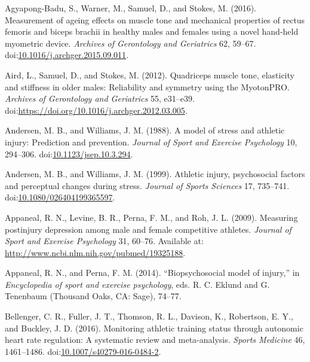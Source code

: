 \documentclass[
  english,
  man,floatsintext]{apa6}
\newlength{\cslhangindent}
\newenvironment{cslreferences}%
  {\setlength{\parindent}{0pt}%
  \everypar{\setlength{\hangindent}{\cslhangindent}}\ignorespaces}%
  {\par}
\begin{document}
\hypertarget{refs}{}
\begin{cslreferences}
\leavevmode\hypertarget{ref-Agyapong-Badu2016}{}%
Agyapong-Badu, S., Warner, M., Samuel, D., and Stokes, M. (2016). Measurement of ageing effects on muscle tone and mechanical properties of rectus femoris and biceps brachii in healthy males and females using a novel hand-held myometric device. \emph{Archives of Gerontology and Geriatrics} 62, 59--67. doi:\href{https://doi.org/10.1016/j.archger.2015.09.011}{10.1016/j.archger.2015.09.011}.

\leavevmode\hypertarget{ref-Aird2012}{}%
Aird, L., Samuel, D., and Stokes, M. (2012). Quadriceps muscle tone, elasticity and stiffness in older males: Reliability and symmetry using the MyotonPRO. \emph{Archives of Gerontology and Geriatrics} 55, e31--e39. doi:\href{https://doi.org/https://doi.org/10.1016/j.archger.2012.03.005}{https://doi.org/10.1016/j.archger.2012.03.005}.

\leavevmode\hypertarget{ref-Andersen1988}{}%
Andersen, M. B., and Williams, J. M. (1988). A model of stress and athletic injury: Prediction and prevention. \emph{Journal of Sport and Exercise Psychology} 10, 294--306. doi:\href{https://doi.org/10.1123/jsep.10.3.294}{10.1123/jsep.10.3.294}.

\leavevmode\hypertarget{ref-Andersen1999}{}%
Andersen, M. B., and Williams, J. M. (1999). Athletic injury, psychosocial factors and perceptual changes during stress. \emph{Journal of Sports Sciences} 17, 735--741. doi:\href{https://doi.org/10.1080/026404199365597}{10.1080/026404199365597}.

\leavevmode\hypertarget{ref-Appaneal2009}{}%
Appaneal, R. N., Levine, B. R., Perna, F. M., and Roh, J. L. (2009). Measuring postinjury depression among male and female competitive athletes. \emph{Journal of Sport and Exercise Psychology} 31, 60--76. Available at: \url{http://www.ncbi.nlm.nih.gov/pubmed/19325188}.

\leavevmode\hypertarget{ref-Appaneal2014}{}%
Appaneal, R. N., and Perna, F. M. (2014). ``Biopsychosocial model of injury,'' in \emph{Encyclopedia of sport and exercise psychology}, eds. R. C. Eklund and G. Tenenbaum (Thousand Oaks, CA: Sage), 74--77.

\leavevmode\hypertarget{ref-Bellenger2016}{}%
Bellenger, C. R., Fuller, J. T., Thomson, R. L., Davison, K., Robertson, E. Y., and Buckley, J. D. (2016). Monitoring athletic training status through autonomic heart rate regulation: A systematic review and meta-analysis. \emph{Sports Medicine} 46, 1461--1486. doi:\href{https://doi.org/10.1007/s40279-016-0484-2}{10.1007/s40279-016-0484-2}.


\end{cslreferences}
\end{document}

